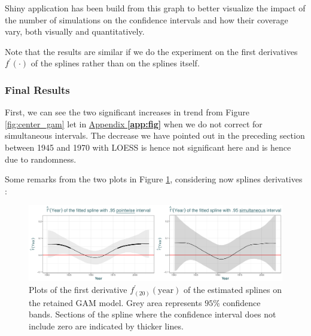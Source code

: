 Shiny application has been build from this graph to better visualize the impact of the number of simulations on the confidence intervals and how their coverage vary, both visually and quantitatively.

Note that the results are similar if we do the experiment on the first derivatives $f^{'}(\cdot)$ of the splines rather than on the splines itself.


\subsubsection*{Final Results}

First, we can see the two significant increases in trend from Figure \ref{fig:center_gam} let in \hyperref[app:fig]{Appendix \textbf{\ref{app:fig}}} when we do not correct for simultaneous intervals. The decrease we have pointed out in the preceding section between 1945 and 1970 with LOESS is hence not significant here and is hence due to randomness.


Some remarks from the two plots in Figure \ref{fig:derivsplines}, considering now splines derivatives :

\begin{figure}[!htb]
	\includegraphics[width=.99\linewidth]{splines.pdf}\caption{Plots of the first derivative $f_{(20)}^{'}(\text{year})$ of the estimated splines on the retained GAM model. Grey area represents $95\%$ confidence bands. Sections of the spline where the confidence interval does not include zero are indicated by thicker lines. }\label{fig:derivsplines}
\end{figure}

